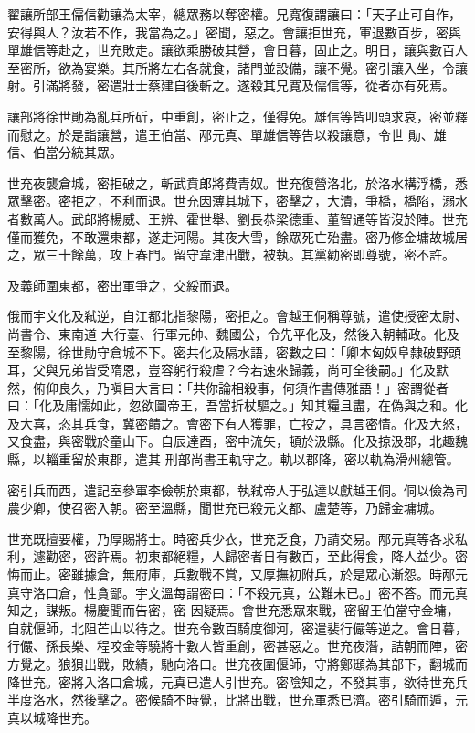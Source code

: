 \begin{pinyinscope}
 翟讓所部王儒信勸讓為太宰，總眾務以奪密權。兄寬復謂讓曰：「天子止可自作，安得與人？汝若不作，我當為之。」密聞，惡之。會讓拒世充，軍退數百步，密與單雄信等赴之，世充敗走。讓欲乘勝破其營，會日暮，固止之。明日，讓與數百人至密所，欲為宴樂。其所將左右各就食，諸門並設備，讓不覺。密引讓入坐，令讓射。引滿將發，密遣壯士蔡建自後斬之。遂殺其兄寬及儒信等，從者亦有死焉。



 讓部將徐世勛為亂兵所斫，中重創，密止之，僅得免。雄信等皆叩頭求哀，密並釋而慰之。於是詣讓營，遣王伯當、邴元真、單雄信等告以殺讓意，令世
 勛、雄信、伯當分統其眾。



 世充夜襲倉城，密拒破之，斬武賁郎將費青奴。世充復營洛北，於洛水構浮橋，悉眾擊密。密拒之，不利而退。世充因薄其城下，密擊之，大潰，爭橋，橋陷，溺水者數萬人。武郎將楊威、王辨、霍世舉、劉長恭梁德重、董智通等皆沒於陣。世充僅而獲免，不敢還東都，遂走河陽。其夜大雪，餘眾死亡殆盡。密乃修金墉故城居之，眾三十餘萬，攻上春門。留守韋津出戰，被執。其黨勸密即尊號，密不許。



 及義師圍東都，密出軍爭之，交綏而退。



 俄而宇文化及弒逆，自江都北指黎陽，密拒之。會越王侗稱尊號，遣使授密太尉、尚書令、東南道
 大行臺、行軍元帥、魏國公，令先平化及，然後入朝輔政。化及至黎陽，徐世勛守倉城不下。密共化及隔水語，密數之曰：「卿本匈奴阜隸破野頭耳，父與兄弟皆受隋恩，豈容躬行殺虐？今若速來歸義，尚可全後嗣。」化及默然，俯仰良久，乃嗔目大言曰：「共你論相殺事，何須作書傳雅語！」密謂從者曰：「化及庸懦如此，忽欲圖帝王，吾當折杖驅之。」知其糧且盡，在偽與之和。化及大喜，恣其兵食，冀密饋之。會密下有人獲罪，亡投之，具言密情。化及大怒，又食盡，與密戰於童山下。自辰達酉，密中流矢，頓於汲縣。化及掠汲郡，北趣魏縣，以輜重留於東郡，遣其
 刑部尚書王軌守之。軌以郡降，密以軌為滑州總管。



 密引兵而西，遣記室參軍李儉朝於東都，執弒帝人于弘達以獻越王侗。侗以儉為司農少卿，使召密入朝。密至溫縣，聞世充已殺元文都、盧楚等，乃歸金墉城。



 世充既擅要權，乃厚賜將士。時密兵少衣，世充乏食，乃請交易。邴元真等各求私利，遽勸密，密許焉。初東都絕糧，人歸密者日有數百，至此得食，降人益少。密悔而止。密雖據倉，無府庫，兵數戰不賞，又厚撫初附兵，於是眾心漸怨。時邴元真守洛口倉，性貪鄙。宇文溫每謂密曰：「不殺元真，公難未已。」密不答。而元真知之，謀叛。楊慶聞而告密，密
 因疑焉。會世充悉眾來戰，密留王伯當守金墉，自就偃師，北阻芒山以待之。世充令數百騎度御河，密遣裴行儼等逆之。會日暮，行儼、孫長樂、程咬金等驍將十數人皆重創，密甚惡之。世充夜潛，詰朝而陣，密方覺之。狼狽出戰，敗績，馳向洛口。世充夜圍偃師，守將鄭頲為其部下，翻城而降世充。密將入洛口倉城，元真已遣人引世充。密陰知之，不發其事，欲待世充兵半度洛水，然後擊之。密候騎不時覺，比將出戰，世充軍悉已濟。密引騎而遁，元真以城降世充。




\end{pinyinscope}
